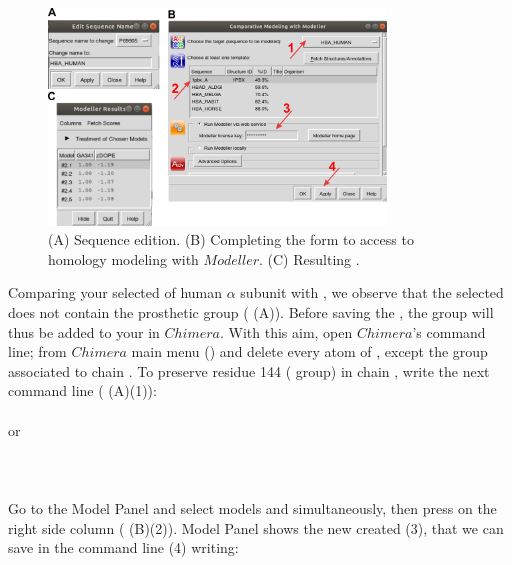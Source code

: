   \begin{figure}[H]
  \centering 
  \captionsetup{width=.7\linewidth} 
  \includegraphics[width=0.80\textwidth]{Images/Fig15.png}
  \caption{(A) Sequence edition. (B) Completing the form to access to homology modeling with $Modeller$. (C) Resulting .}
  \label{fig:modeller}
  \end{figure}
 
 Comparing your selected  of human  $\alpha$ subunit with  , we observe that the selected   does not contain the  prosthetic group ( (A)). Before saving the , the   group will thus be added to your  in $Chimera$. With this aim, open $Chimera$'s command line; from $Chimera$ main menu () and delete every atom of  , except the  group associated to chain . To preserve residue 144 ( group) in chain , write the next command line ( (A)(1)):\\ 
 
 \\ or\\
 \\ \\ \\
 
 Go to the Model Panel and select models  and  simultaneously, then press  on the right side column ( (B)(2)). Model Panel shows the new  created  (3), that we can save in the command line (4) writing:\\
 
